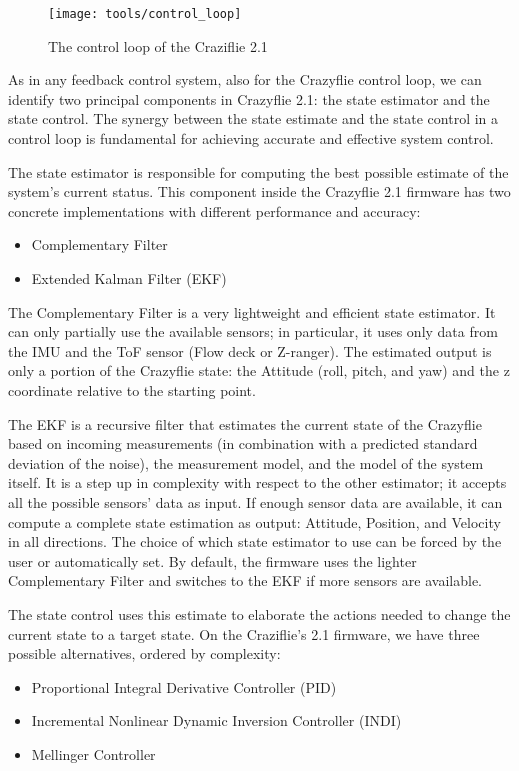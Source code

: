 \begin{figure}[tb]
    \centering
    \texttt{[image: tools/control\_loop]}
    \caption[Craziflie's control loop]{
        The control loop of the Craziflie 2.1~\cite{bitcraze}
    }\label{fig:control_loop}
\end{figure}

As in any feedback control system, also for the Crazyflie control loop, we can identify two principal components in Crazyflie 2.1: the state estimator and the state control. 
The synergy between the state estimate and the state control in a control loop is fundamental for achieving accurate and effective system control. 

The state estimator is responsible for computing the best possible estimate of the system's current status.
This component inside the Crazyflie 2.1 firmware has two concrete implementations with different performance and accuracy:
\begin{itemize}
    \item Complementary Filter
    \item Extended Kalman Filter (EKF)
\end{itemize}

The Complementary Filter is a very lightweight and efficient state estimator. 
It can only partially use the available sensors; in particular, it uses only data from the IMU and the ToF sensor (Flow deck or Z-ranger).
The estimated output is only a portion of the Crazyflie state: the Attitude (roll, pitch, and yaw) and the z coordinate relative to the starting point.

The EKF is a recursive filter that estimates the current state of the Crazyflie based on incoming measurements (in combination with a predicted standard deviation of the noise), the measurement model, and the model of the system itself. 
It is a step up in complexity with respect to the other estimator; it accepts all the possible sensors' data as input. 
If enough sensor data are available, it can compute a complete state estimation as output: Attitude, Position, and Velocity in all directions.
The choice of which state estimator to use can be forced by the user or automatically set. 
By default, the firmware uses the lighter Complementary Filter and switches to the EKF if more sensors are available.

The state control uses this estimate to elaborate the actions needed to change the current state to a target state.
On the Craziflie's 2.1 firmware, we have three possible alternatives, ordered by complexity:
\begin{itemize}
    \item Proportional Integral Derivative Controller (PID)
    \item Incremental Nonlinear Dynamic Inversion Controller (INDI)
    \item Mellinger Controller
\end{itemize}

